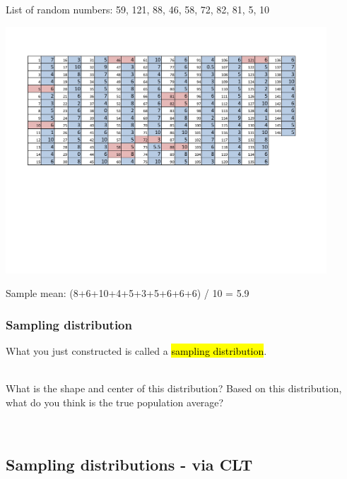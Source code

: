 \begin{frame}[fragile]
\frametitle{}

 List of random numbers: 59, 121,  88,  46,  58,  72,  82,  81,   5,  10 \\

\begin{center}
\includegraphics[width=0.9\textwidth]{4-1_var_in_est/figures/no_drinks_drunk/no_drinks_drunk_marked} 
\end{center}

\pause

Sample mean: (8+6+10+4+5+3+5+6+6+6) / 10 = 5.9

\end{frame}



\begin{frame}[fragile]
\frametitle{Sampling distribution}

What you just constructed is called a \hl{sampling distribution}.

\pause

$\:$ \\
\dq
{What is the shape and center of this distribution? Based on this distribution, what do you think is the true population average?}

$\:$ \\

\end{frame}



\subsection{Sampling distributions - via CLT}


